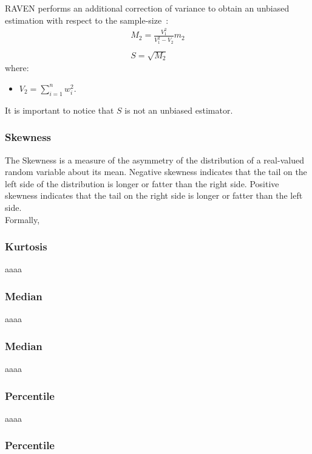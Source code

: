 RAVEN performs an additional correction of variance to obtain an unbiased estimation  with respect to the sample-size~\cite{RimoldiniUnbiased}:
\begin{equation}
\begin{matrix}
M_{2} = \frac{V_{1}^{2}}{V_{1}^{2} - V_{2}}m_{2}
\\
\\
S = \sqrt{M_{2}}
\end{matrix}
\end{equation}
where:
\begin{itemize}
  \item $V_{2} = \sum_{i=1}^{n} w_{i}^{2}$.
\end{itemize}
It is important to notice that $S$ is not an unbiased estimator.

\subsubsection{Skewness}
The Skewness is a measure of the asymmetry of the distribution of a 
real-valued random variable about its mean. Negative skewness 
indicates that the tail on the left side of the distribution is longer or fatter 
than the right side.  Positive skewness indicates that the tail on the right 
side is longer or fatter than the left side.
\\Formally, 


\subsubsection{Kurtosis}

aaaa
\subsubsection{Median}

aaaa
\subsubsection{Median}
aaaa
\subsubsection{Percentile}


aaaa
\subsubsection{Percentile}


